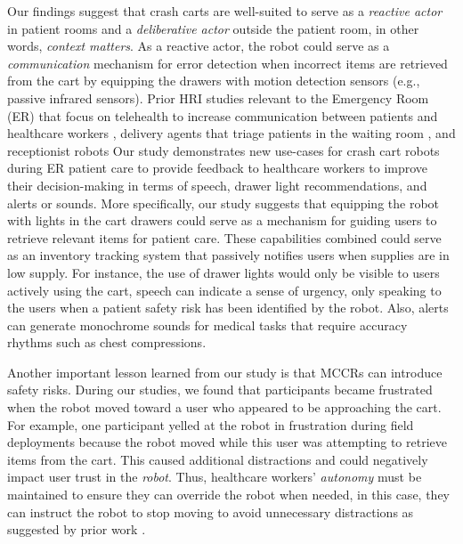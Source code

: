 Our findings suggest that crash carts are well-suited to serve as a \textit{reactive actor} in patient rooms and a \textit{deliberative actor} outside the patient room, in other words, \textit{context matters}.
As a reactive actor, the robot could serve as a \textit{communication} mechanism for error detection when incorrect items are retrieved from the cart by equipping the drawers with motion detection sensors (e.g., passive infrared sensors). 
Prior HRI studies relevant to the Emergency Room (ER) that focus on telehealth to increase communication between patients and healthcare workers \cite{matsumoto2023robot}, delivery agents that triage patients in the waiting room \cite{wilkes2010heterogeneous}, and receptionist robots \cite{ahn2015healthcare}
Our study demonstrates new use-cases for crash cart robots during ER patient care to provide feedback to healthcare workers to improve their decision-making in terms of speech, drawer light recommendations, and alerts or sounds. 
More specifically, our study suggests that equipping the robot with lights in the cart drawers could serve as a mechanism for guiding users to retrieve relevant items for patient care. 
These capabilities combined could serve as an inventory tracking system that passively notifies users when supplies are in low supply. 
For instance, the use of drawer lights would only be visible to users actively using the cart, speech can indicate a sense of urgency, only speaking to the users when a patient safety risk has been identified by the robot. 
Also, alerts can generate monochrome sounds for medical tasks that require accuracy rhythms such as chest compressions.

Another important lesson learned from our study is that MCCRs can introduce safety risks. 
During our studies, we found that participants became frustrated when the robot moved toward a user who appeared to be approaching the cart. 
For example, one participant yelled at the robot in frustration during field deployments because the robot moved while this user was attempting to retrieve items from the cart. 
This caused additional distractions and could negatively impact user trust in the \textit{robot}. 
Thus, healthcare workers' \textit{autonomy} must be maintained to ensure they can override the robot when needed, in this case, they can instruct the robot to stop moving to avoid unnecessary distractions as suggested by prior work \cite{taylor2024towards_blind}.

